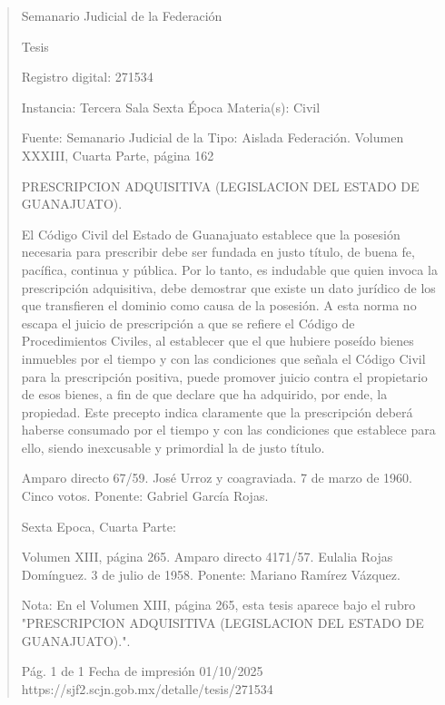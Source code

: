 \documentclass[11pt,a4paper]{article}
\begin{document}
\begin{quote}
                                                   Semanario Judicial de la Federación

                                                  Tesis

 Registro digital: 271534

 Instancia: Tercera Sala          Sexta Época                           Materia(s): Civil

                                  Fuente: Semanario Judicial de la      Tipo: Aislada
                                  Federación.
                                  Volumen XXXIII, Cuarta Parte,
                                  página 162


PRESCRIPCION ADQUISITIVA (LEGISLACION DEL ESTADO DE GUANAJUATO).


El Código Civil del Estado de Guanajuato establece que la posesión necesaria para prescribir debe
ser fundada en justo título, de buena fe, pacífica, continua y pública. Por lo tanto, es indudable que
quien invoca la prescripción adquisitiva, debe demostrar que existe un dato jurídico de los que
transfieren el dominio como causa de la posesión. A esta norma no escapa el juicio de prescripción
a que se refiere el Código de Procedimientos Civiles, al establecer que el que hubiere poseído
bienes inmuebles por el tiempo y con las condiciones que señala el Código Civil para la prescripción
positiva, puede promover juicio contra el propietario de esos bienes, a fin de que declare que ha
adquirido, por ende, la propiedad. Este precepto indica claramente que la prescripción deberá
haberse consumado por el tiempo y con las condiciones que establece para ello, siendo inexcusable
y primordial la de justo título.


Amparo directo 67/59. José Urroz y coagraviada. 7 de marzo de 1960. Cinco votos. Ponente:
Gabriel García Rojas.

Sexta Epoca, Cuarta Parte:

Volumen XIII, página 265. Amparo directo 4171/57. Eulalia Rojas Domínguez. 3 de julio de 1958.
Ponente: Mariano Ramírez Vázquez.

Nota: En el Volumen XIII, página 265, esta tesis aparece bajo el rubro "PRESCRIPCION
ADQUISITIVA (LEGISLACION DEL ESTADO DE GUANAJUATO).".




                                             Pág. 1 de 1             Fecha de impresión 01/10/2025
  https://sjf2.scjn.gob.mx/detalle/tesis/271534

\end{quote}
\end{document}
